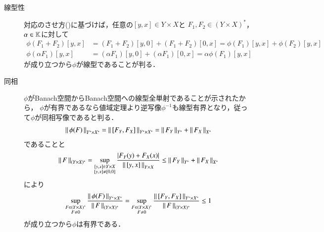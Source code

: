 	\begin{prf}\mbox{}
		\begin{description}
			\item[線型性]
				対応のさせ方()に基づけば，任意の$[y,x] \in Y \times X$と
				$F_1,F_2 \in (Y \times X)^*$，$\alpha \in \mathbb{K}$に対して
				\begin{align}
					\phi(F_1 + F_2)[y,x] &= (F_1 + F_2)[y,0] + (F_1 + F_2)[0,x] = \phi(F_1)[y,x] + \phi(F_2)[y,x]　\\
					\phi(\alpha F_1)[y,x] &= (\alpha F_1)[y,0] + (\alpha F_1)[0,x] = \alpha \phi(F_1)[y,x]
				\end{align}
				が成り立つから$\phi$が線型であることが判る．
			
			\item[同相] $\phi$がBanach空間からBanach空間への線型全単射であることが示されたから，
				$\phi$が有界であるなら値域定理より逆写像$\phi^{-1}$も線型有界となり，従って$\phi$が同相写像であると判る．
				\begin{align}
					\left\|\, \phi(F)\, \right\|_{Y^* \times X^*} = \left\|\, [F_Y,F_X]\, \right\|_{Y^* \times X^*} = \left\|\, F_Y\, \right\|_{Y^*} + \left\|\, F_X\, \right\|_{X^*}
				\end{align}
				であることと
				\begin{align}
					\left\|\, F\, \right\|_{(Y \times X)^*}
					= \operatorname*{sup}_{\substack{[y,x] \in Y \times X \\ [y,x] \neq [0,0]}} \frac{|F_Y(y) + F_X(x)|}{\left\|\, [y,x]\, \right\|_{Y \times X}}
					\leq \left\|\, F_Y\, \right\|_{Y^*} + \left\|\, F_X\, \right\|_{X^*}
				\end{align}
				により
				\begin{align}
					\operatorname*{sup}_{\substack{F \in (Y \times X)^* \\ F \neq 0}} \frac{\left\|\, \phi(F)\, \right\|_{Y^* \times X^*}}{\left\|\, F\, \right\|_{(Y \times X)^*}}
					= \operatorname*{sup}_{\substack{F \in (Y \times X)^* \\ F \neq 0}} \frac{\left\|\, [F_Y,F_X]\, \right\|_{Y^* \times X^*}}{\left\|\, F\, \right\|_{(Y \times X)^*}} \leq 1
				\end{align}
				が成り立つから$\phi$は有界である．
		\end{description}
		\QED
	\end{prf}
	
